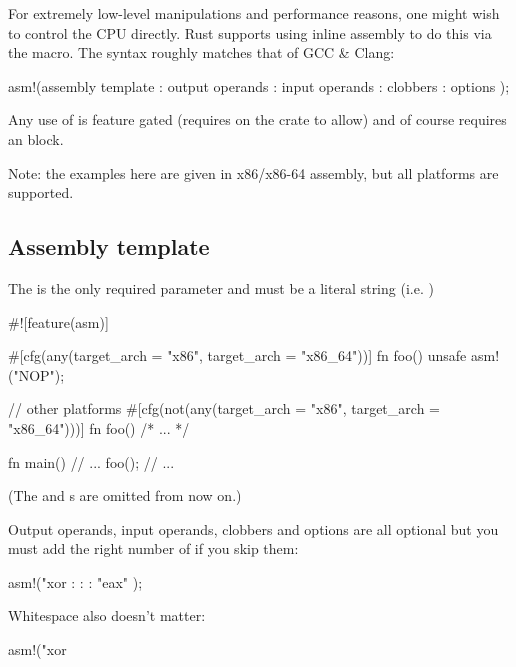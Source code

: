 For extremely low-level manipulations and performance reasons, one might wish to control the CPU directly. Rust supports 
using inline assembly to do this via the  macro. The syntax roughly matches that of GCC \& Clang:

\begin{rustc}
asm!(assembly template
   : output operands
   : input operands
   : clobbers
   : options
   );
\end{rustc}

Any use of  is feature gated (requires  on the crate to allow) and of course requires 
an  block.

\begin{myquote}
Note: the examples here are given in x86/x86-64 assembly, but all platforms are supported.
\end{myquote}

\subsection*{Assembly template}

The  is the only required parameter and must be a literal string (i.e. )

\begin{rustc}
#![feature(asm)]

#[cfg(any(target_arch = "x86", target_arch = "x86_64"))]
fn foo() {
    unsafe {
        asm!("NOP");
    }
}

// other platforms
#[cfg(not(any(target_arch = "x86", target_arch = "x86_64")))]
fn foo() { /* ... */ }

fn main() {
    // ...
    foo();
    // ...
}
\end{rustc}

(The  and \code{\#[cfg]}s are omitted from now on.)

\blank

Output operands, input operands, clobbers and options are all optional but you must add the right number of \code{:} 
if you skip them:

\begin{rustc}
asm!("xor %
    :
    :
    : "{eax}"
   );
\end{rustc}

Whitespace also doesn't matter:

\begin{rustc}
asm!("xor %
\end{rustc}

